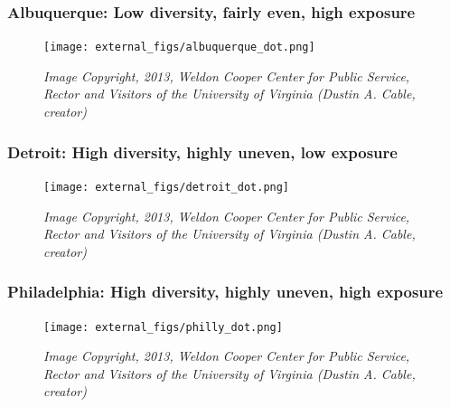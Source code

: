 \documentclass{beamer}
\begin{document}
	\iflong
	\begin{frame}\frametitle{Albuquerque: Low diversity, fairly even, high exposure}
		\begin{figure}
			\texttt{[image: external\_figs/albuquerque\_dot.png]}
			\caption{\textit{Image Copyright, 2013, Weldon Cooper Center for Public Service, Rector and Visitors of the University of Virginia (Dustin A. Cable, creator)}}
		\end{figure}
	\end{frame}
	\fi
	\iflong
	\begin{frame}\frametitle{Detroit: High diversity, highly uneven, low exposure}
		\begin{figure}
			\texttt{[image: external\_figs/detroit\_dot.png]}
			\caption{\textit{Image Copyright, 2013, Weldon Cooper Center for Public Service, Rector and Visitors of the University of Virginia (Dustin A. Cable, creator)}}
		\end{figure}
	\end{frame}
	\fi
	\iflong
	\begin{frame}\frametitle{Philadelphia: High diversity, highly uneven, high exposure}
		\begin{figure}
			\texttt{[image: external\_figs/philly\_dot.png]}
			\caption{\textit{Image Copyright, 2013, Weldon Cooper Center for Public Service, Rector and Visitors of the University of Virginia (Dustin A. Cable, creator)}}
		\end{figure}
	\end{frame}
	\fi
\end{document}
